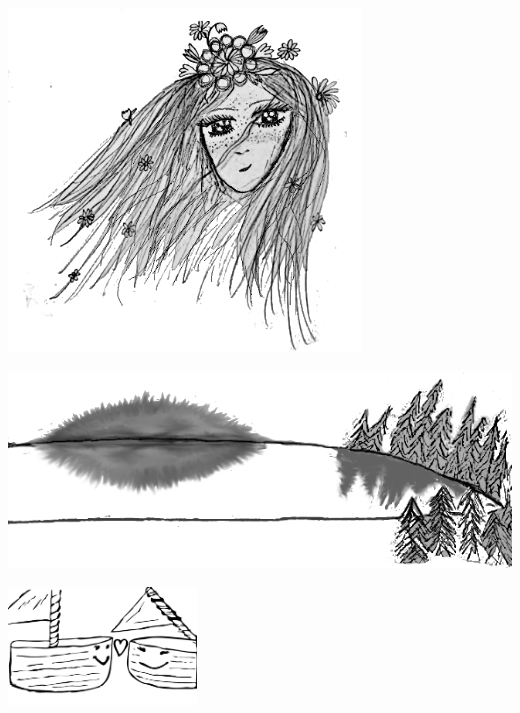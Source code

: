\begin{intersong}
	\begin{center}
		\includegraphics[width=0.7\textwidth]{../bilder/fardigabilder/CamillasFardigaBilder/Svinstaskar2.png} 
	\end{center}
\end{intersong}
\sclearpage

\begin{intersong}
	\begin{center}
		\vspace{20mm}
		\includegraphics[width=1\textwidth]{../bilder/fardigabilder/CamillasFardigaBilder/Oppnalandskap3.png} 
	\end{center}
\end{intersong}
\sclearpage



\begin{intersong}
	\begin{center}
		\vspace{20mm}
		\includegraphics[width=5cm]{../bilder/fardigabilder/Batlat.png} 
	\end{center}
\end{intersong}
\sclearpage

\sclearpage